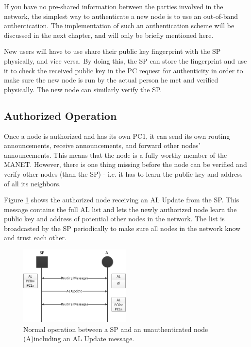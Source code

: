 If you have no pre-shared information between the parties involved in the
network, the simplest way to authenticate a new node is to use an out-of-band
authentication. The implementation of such an authentication scheme will be
discussed in the next chapter, and will only be briefly mentioned here.

New users will have to use share their public key fingerprint with the \ac{SP}
physically, and vice versa. By doing this, the \ac{SP} can store the fingerprint
and use it to check the received public key in the \ac{PC} request for
authenticity in order to make sure the new node is run by the actual person he
met and verified physically. The new node can similarly verify the \ac{SP}.

\subsection{Authorized Operation}
Once a node is authorized and has its own \ac{PC1}, it can send its own routing
announcements, receive announcements, and forward other nodes' announcements.
This means that the node is a fully worthy member of the MANET. However, there
is one thing missing before the node can be verified and verify other nodes
(than the \ac{SP}) - i.e. it has to learn the public key and address of all its
neighbors.

Figure \ref{fig:node_states_authorized} shows the authorized node receiving
an \ac{AL} Update from the \ac{SP}. This message contains the full \ac{AL} list
and lets the newly authorized node learn the public key and address of potential
other nodes in the network. The list is broadcasted by the \ac{SP} periodically
to make sure all nodes in the network know and trust each other.

\begin{figure}[h]
	\centering
  	\includegraphics[width=0.5\textwidth]{images/node_states_authorized.png}
  	\caption{Normal operation between a \acf{SP} and an unauthenticated node
  	(A)including an \ac{AL} Update message.}
	\label{fig:node_states_authorized}
\end{figure}



